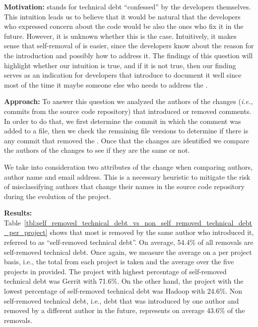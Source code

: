 \noindent\rqii

\noindent \textbf{Motivation:} \SATD stands for technical debt ``confessed'' by the developers themselves. This intuition leads us to believe that it would be natural that the developers who expressed concern about the code would be also the ones who fix it in the future. However, it is unknown whether this is the case. Intuitively, it makes sense that self-removal of \SATD is easier, since the developers know about the reason for the \SATD introduction and possibly how to address it. The findings of this question will highlight whether our intuition is true, and if it is not true, then our finding serves as an indication for developers that introduce \SATD to document it well since most of the time it maybe someone else who needs to address the \SATD.



\noindent \textbf{Approach:} To answer this question we analyzed the authors of the changes (\textit{i.e.,} commits from the source code repository) that introduced or removed \SATD comments. In order to do that, we first determine the commit in which the \SATD comment was added to a file, then we check the remaining file versions to determine if there is any commit that removed the \SATD. Once that the changes are identified we compare the authors of the changes to see if they are the same or not. 

We take into consideration two attributes of the change when comparing authors, author name and email address. This is a necessary heuristic to mitigate the risk of misclassifying authors that change their names in the source code repository during the evolution of the project.  


\noindent \textbf{Results:} Table~\ref{tbl:self_removed_technical_debt_vs_non_self_removed_technical_debt_per_project} shows that most \SATD is removed by the same author who introduced it, referred to as ``self-removed technical debt''. On average, 54.4\% of all removals are self-removed technical debt. Once again, we measure the average on a per project basis, i.e., the total from each project is taken and the average over the five projects in provided. The project with highest percentage of self-removed technical debt was Gerrit with 71.6\%. On the other hand, the project with the lowest percentage of self-removed technical debt was Hadoop with 24.6\%. Non self-removed technical debt, i.e., debt that was introduced by one author and removed by a different author in the future, represents on average 43.6\% of the removals.

